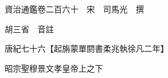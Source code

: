 










 


 
 


 

  
  
  
  
  





  
  
  
  
  
 
  

  

  
  
  



  

 
 

  
   




  

  
  


  　　資治通鑑卷二百六十　宋　司馬光　撰

　　胡三省　音註

　　唐紀七十六【起旃蒙單閼書柔兆執徐凡二年】

　　昭宗聖穆景文孝皇帝上之下

